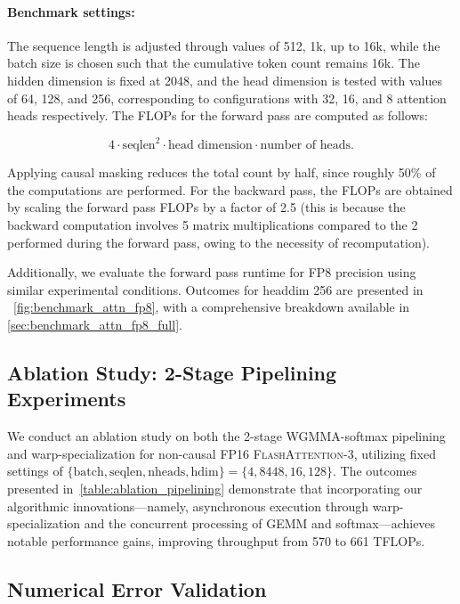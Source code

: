 \paragraph{Benchmark settings:} The sequence length is adjusted through values of 512, 1k, up to 16k, while the batch size is chosen such that the cumulative token count remains 16k. The hidden dimension is fixed at 2048, and the head dimension is tested with values of 64, 128, and 256, corresponding to configurations with 32, 16, and 8 attention heads respectively. The FLOPs for the forward pass are computed as follows:

\begin{equation*}
  4 \cdot \text{seqlen}^2 \cdot \text{head dimension} \cdot \text{number of heads}.
\end{equation*}

Applying causal masking reduces the total count by half, since roughly 50\% of the computations are performed. For the backward pass, the FLOPs are obtained by scaling the forward pass FLOPs by a factor of 2.5 (this is because the backward computation involves 5 matrix multiplications compared to the 2 performed during the forward pass, owing to the necessity of recomputation).

Additionally, we evaluate the forward pass runtime for FP8 precision using similar experimental conditions. Outcomes for headdim 256 are presented in ~\cref{fig:benchmark_attn_fp8}, with a comprehensive breakdown available in \cref{sec:benchmark_attn_fp8_full}.

\subsection{Ablation Study: 2-Stage Pipelining Experiments}
\label{sec:2-stage-pipelining-experiments}

We conduct an ablation study on both the 2-stage WGMMA-softmax pipelining and warp-specialization for non-causal FP16 \textsc{FlashAttention-3}, utilizing fixed settings of $\{\text{batch}, \text{seqlen}, \text{nheads}, \text{hdim}\} = \{ 4, 8448, 16, 128\}$. The outcomes presented in~\cref{table:ablation_pipelining} demonstrate that incorporating our algorithmic innovations—namely, asynchronous execution through warp-specialization and the concurrent processing of GEMM and softmax—achieves notable performance gains, improving throughput from 570 to 661 TFLOPs.

\subsection{Numerical Error Validation}
\label{sec:numerical_error}


